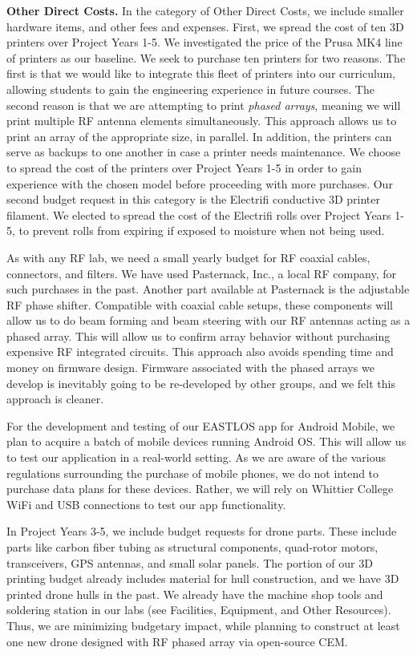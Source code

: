 \documentclass[10pt]{amsart}
\theoremstyle{definition}
\numberwithin{equation}{section}
\begin{document}
\textbf{Other Direct Costs.} In the category of Other Direct Costs, we include smaller hardware items, and other fees and expenses.  First, we spread the cost of ten 3D printers over Project Years 1-5.  We investigated the price of the Prusa MK4 line of printers as our baseline.  We seek to purchase ten printers for two reasons.  The first is that we would like to integrate this fleet of printers into our curriculum, allowing students to gain the engineering experience in future courses.  The second reason is that we are attempting to print \textit{phased arrays}, meaning we will print multiple RF antenna elements simultaneously.  This approach allows us to print an array of the appropriate size, in parallel.  In addition, the printers can serve as backups to one another in case a printer needs maintenance.  We choose to spread the cost of the printers over Project Years 1-5 in order to gain experience with the chosen model before proceeding with more purchases.  Our second budget request in this category is the Electrifi conductive 3D printer filament.  We elected to spread the cost of the Electrifi rolls over Project Years 1-5, to prevent rolls from expiring if exposed to moisture when not being used. 

As with any RF lab, we need a small yearly budget for RF coaxial cables, connectors, and filters.  We have used Pasternack, Inc., a local RF company, for such purchases in the past.  Another part available at Pasternack is the adjustable RF phase shifter.  Compatible with coaxial cable setups, these components will allow us to do beam forming and beam steering with our RF antennas acting as a phased array.  This will allow us to confirm array behavior without purchasing expensive RF integrated circuits.  This approach also avoids spending time and money on firmware design.  Firmware associated with the phased arrays we develop is inevitably going to be re-developed by other groups, and we felt this approach is cleaner. 

For the development and testing of our EASTLOS app for Android Mobile, we plan to acquire a batch of mobile devices running Android OS.  This will allow us to test our application in a real-world setting.  As we are aware of the various regulations surrounding the purchase of mobile phones, we do not intend to purchase data plans for these devices.  Rather, we will rely on Whittier College WiFi and USB connections to test our app functionality. 

In Project Years 3-5, we include budget requests for drone parts.  These include parts like carbon fiber tubing as structural components, quad-rotor motors, transceivers, GPS antennas, and small solar panels.  The portion of our 3D printing budget already includes material for hull construction, and we have 3D printed drone hulls in the past.  We already have the machine shop tools and soldering station in our labs (see Facilities, Equipment, and Other Resources).  Thus, we are minimizing budgetary impact, while planning to construct at least one new drone designed with RF phased array via open-source CEM. 
\end{document}
